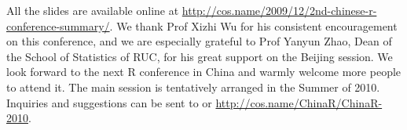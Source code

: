 All the slides are available online at
\url{http://cos.name/2009/12/2nd-chinese-r-conference-summary/}. We
thank Prof Xizhi Wu for his consistent encouragement on this
conference, and we are especially grateful to Prof Yanyun Zhao, Dean
of the School of Statistics of RUC, for his great support on the
Beijing session. We look forward to the next R conference in China
and warmly welcome more people to attend it. The main session is
tentatively arranged in the Summer of 2010. Inquiries and
suggestions can be sent to  or
\url{http://cos.name/ChinaR/ChinaR-2010}.



\address{Jing Jiao\\
  School of Resources and Environment Science\\
  East China Normal University\\
  China P. R.}\\

\address{Jingjing Guan\\
  School of Statistics, Renmin University of China\\
  China P. R.}\\

\address{Yihui Xie\\
  Department of Statistics \& Statistical Laboratory\\
  Iowa State University\\
  USA}\\
